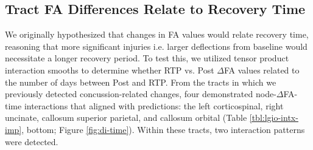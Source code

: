 \documentclass[12pt]{article}
\begin{document}
\subsection{Tract FA Differences Relate to Recovery Time}
\label{ssec:res-dwi-time}
We originally hypothesized that changes in FA values would relate recovery time, reasoning that more significant injuries i.e. larger deflections from baseline would necessitate a longer recovery period. To test this, we utilized tensor product interaction smooths to determine whether RTP vs. Post $\Delta$FA values related to the number of days between Post and RTP. From the tracts in which we previously detected concussion-related changes, four demonstrated node-$\Delta$FA-time interactions that aligned with predictions: the left corticospinal, right uncinate, callosum superior parietal, and callosum orbital (Table \ref{tbl:lgio-intx-imp}, bottom; Figure \ref{fig:di-time}). Within these tracts, two interaction patterns were detected.
\end{document}
